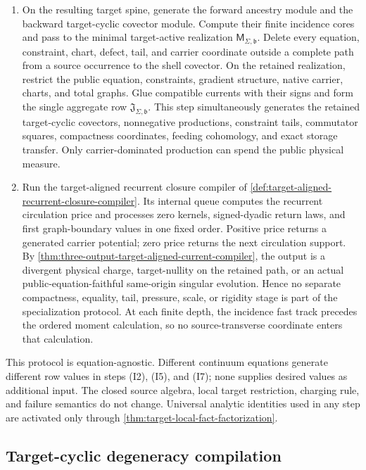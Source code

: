 \documentclass[11pt]{article}
\numberwithin{section}{part}
\theoremstyle{plain}
\theoremstyle{definition}
\theoremstyle{remark}
\begin{document}
\begin{enumerate}[label=\textup{(I\arabic*)}]
\item On the resulting target spine, generate the forward ancestry module and
  the backward target-cyclic covector module.  Compute their finite incidence
  cores and pass to the minimal target-active realization
  \(\mathsf M_{\Sigma,\mathfrak b}\).  Delete every equation, constraint,
  chart, defect, tail, and carrier coordinate outside a complete path from a
  source occurrence to the shell covector.  On the retained realization,
  restrict the public equation, constraints, gradient structure, native
  carrier, charts, and total graphs.  Glue compatible currents with their signs and form the single aggregate row
  \(\mathfrak J_{\Sigma,\mathfrak b}\).  This step simultaneously generates
  the retained target-cyclic covectors, nonnegative productions, constraint tails,
  commutator squares, compactness coordinates, feeding cohomology, and exact
  storage transfer.  Only carrier-dominated production can spend the public
  physical measure.
\item Run the target-aligned recurrent closure compiler of
  \cref{def:target-aligned-recurrent-closure-compiler}.  Its internal queue
  computes the recurrent circulation price and processes zero kernels,
  signed-dyadic return laws, and first graph-boundary values in one fixed
  order.  Positive price returns a generated carrier potential; zero price
  returns the next circulation support.  By
  \cref{thm:three-output-target-aligned-current-compiler}, the output is a
  divergent physical charge, target-nullity on the retained path, or an
  actual public-equation-faithful same-origin singular evolution.  Hence no
  separate compactness, equality, tail, pressure, scale, or rigidity stage is
  part of the specialization protocol.  At each finite depth, the incidence
  fast track precedes the ordered moment calculation, so no source-transverse
  coordinate enters that calculation.
\end{enumerate}

This protocol is equation-agnostic.  Different continuum equations generate
different row values in steps \textup{(I2)}, \textup{(I5)}, and
\textup{(I7)}; none supplies desired values as additional
input.  The closed source algebra, local target restriction, charging rule,
and failure semantics do not change.  Universal analytic identities used in
any step are activated only through
\cref{thm:target-local-fact-factorization}.

\subsection{Target-cyclic degeneracy compilation}
\label{subsec:target-cyclic-degeneracy}
\end{document}
